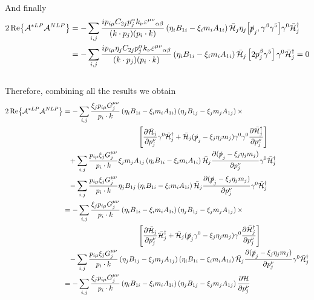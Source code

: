 \documentclass{article}
\newcommand{\s}[1]{\slashed #1}
\begin{document}
\\
And finally
\begin{align*}
	2\Re{\mathcal{A}^{*LP}\mathcal{A}^{NLP}} &=-\sum_{i,j}\frac{ip_{i\mu}C_{2j}p^\alpha_jk_\nu\varepsilon^{\mu\nu}{}_{\alpha\beta}}{(k\cdot p_j)(p_i\cdot k)}\left(\eta_iB_{1i}-\xi_im_iA_{1i}\right)\bar{\mathcal{H}}_j\eta_j\comm{\s{p}_j}{\gamma^\beta \gamma^5}\gamma^0\bar{\mathcal{H}}^\dag_j\\&
	=-\sum_{i,j}\frac{ip_{i\mu}\eta_jC_{2j}p^\alpha_jk_\nu\varepsilon^{\mu\nu}{}_{\alpha\beta}}{(k\cdot p_j)(p_i\cdot k)}\left(\eta_iB_{1i}-\xi_im_iA_{1i}\right)\bar{\mathcal{H}}_j\left[2p_j^\beta \gamma^5\right]\gamma^0\bar{\mathcal{H}}^\dag_j=0
\end{align*}
\\
Therefore, combining all the results we obtain
\begin{align*}
	2\Re{\mathcal{A}^{*LP}\mathcal{A}^{NLP}} &=-\sum_{i,j}\frac{\xi_j p_{i\mu}G_j^{\mu\nu}}{p_i\cdot k}\left(\eta_iB_{1i}-\xi_im_iA_{1i}\right)\left(\eta_jB_{1j}-\xi_jm_jA_{1j}\right)\times\\&\hspace{3.7cm}\left[\pdv{\bar{\mathcal{H}}_j}{p_{j}^\nu} (\s{p}_j-\xi_j\eta_jm_j)\gamma^0\bar{\mathcal{H}}^\dag_j+\bar{\mathcal{H}}_j(\s{p}_j-\xi_j\eta_jm_j)\gamma^0\gamma^0\pdv{\bar{\mathcal{H}}^\dag_j}{p_{j}^\nu}\right]\\&\phantom{=}
	+\sum_{i,j}\frac{p_{i\mu} \xi_jG_j^{\mu\nu}}{p_i\cdot k}\xi_jm_jA_{1j}\left(\eta_iB_{1i}-\xi_im_iA_{1i}\right)\bar{\mathcal{H}}_j\pdv{(\s{p}_j-\xi_j\eta_j m_j)}{p_j^\nu}\gamma^0\bar{\mathcal{H}}^\dag_j\\&\phantom{=}
	- \sum_{i,j}\frac{p_{i\mu}\xi_jG^{\mu\nu}_j}{p_i\cdot k} \eta_jB_{1j}\left(\eta_iB_{1i}-\xi_im_iA_{1i}\right)\bar{\mathcal{H}}_j\pdv{(\s{p}_j-\xi_j\eta_j m_j)}{p_j^\nu}\gamma^0\bar{\mathcal{H}}^\dag_j\\&
	=-\sum_{i,j}\frac{\xi_j p_{i\mu}G_j^{\mu\nu}}{p_i\cdot k}\left(\eta_iB_{1i}-\xi_im_iA_{1i}\right)\left(\eta_jB_{1j}-\xi_jm_jA_{1j}\right)\times\\&\hspace{3.7cm}\left[\pdv{\bar{\mathcal{H}}_j}{p_{j}^\nu} (\s{p}_j\gamma^0-\xi_j\eta_jm_j)\bar{\mathcal{H}}^\dag_j+\bar{\mathcal{H}}_j(\s{p}_j\gamma^0-\xi_j\eta_jm_j)\gamma^0\pdv{\bar{\mathcal{H}}^\dag_j}{p_{j}^\nu}\right]\\&\phantom{=}
	- \sum_{i,j}\frac{p_{i\mu}\xi_jG^{\mu\nu}_j}{p_i\cdot k}\left( \eta_jB_{1j}-\xi_jm_jA_{1j}\right)\left(\eta_iB_{1i}-\xi_im_iA_{1i}\right)\bar{\mathcal{H}}_j\pdv{(\s{p}_j-\xi_j\eta_j m_j)}{p_j^\nu}\gamma^0\bar{\mathcal{H}}^\dag_j\\&
	=-\sum_{i,j}\frac{\xi_j p_{i\mu}G_j^{\mu\nu}}{p_i\cdot k}\left(\eta_iB_{1i}-\xi_im_iA_{1i}\right)\left(\eta_jB_{1j}-\xi_jm_jA_{1j}\right)\pdv{\mathcal{H}}{p_j^\nu}
\end{align*}
\end{document}
